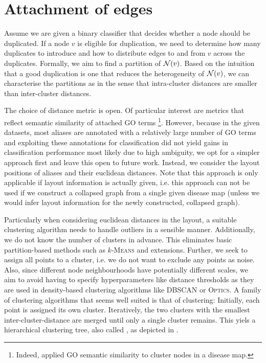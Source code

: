 \documentclass[
	fontsize=10pt, %
	twoside=false, %
	secnumdepth=1, %
]{kaobook}
\begin{document}
\section{Attachment of edges}
\label{sec:edge attachment}


Assume we are given a binary classifier that decides whether a node should be
duplicated. If a node $v$ is eligible for duplication, we need to determine how
many duplicates to introduce and how to distribute edges to and from $v$ across
the duplicates. Formally, we aim to find a partition of $\mathcal{N}(v)$. Based on
the intuition that a good duplication is one that reduces the heterogeneity of
$\mathcal{N}(v)$, we can characterise the partitions as  in the sense
that intra-cluster distances are smaller than inter-cluster distances.

The choice of distance metric is open. Of particular interest are metrics that
reflect semantic similarity of attached GO terms \footnote{ Indeed,
  \citeauthor{ostaszewski_ClusteringApproachesVisual_2018} applied GO semantic
  similarity to cluster nodes in a disease map. }. However, because in the given
datasets, most aliases are annotated with a relatively large number of GO terms
and exploiting these annotations for classification did not yield gains in
classification performance most likely due to high ambiguity, we opt for a
simpler approach first and leave this open to future work. %
Instead, we consider the layout positions of aliases and their euclidean
distances. Note that this approach is only applicable if layout information is
actually given, i.e. this approach can not be used if we construct a collapsed
graph from a single given disease map (unless we would infer layout information
for the newly constructed, collapsed graph).

Particularly when considering euclidean distances in the layout, a suitable
clustering algorithm needs to handle outliers in a sensible manner.
Additionally, we do not know the number of clusters in advance. This eliminates
basic partition-based methods such as $k$-\textsc{Means} and extensions.
%
Further, we seek to assign all points to a cluster, i.e. we do not want to
exclude any points as noise. Also, since different node neighbourhoods have
potentially different scales, we aim to avoid having to specify hyperparameters
like distance thresholds as they are used in density-based clustering algorithms
like \textsc{DBSCAN} or \textsc{Optics}.
%
A family of clustering algorithms that seems well suited is that of
 clustering: Initially, each point is assigned its own
cluster. Iteratively, the two clusters with the smallest inter-cluster-distance
are merged until only a single cluster remains. This yiels a hierarchical
clustering tree, also called , as depicted in .
\end{document}
